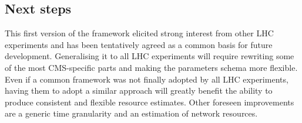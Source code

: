 \subsection{Next steps}
This first version of the framework elicited strong interest from
other LHC experiments and has been tentatively agreed as a common
basis for future development. Generalising it to all LHC experiments
will require rewriting some of the most CMS-specific parts and making
the parameters schema more flexible. Even if a common framework was
not finally adopted by all LHC experiments, having them to adopt a
similar approach will greatly benefit the ability to produce
consistent and flexible resource estimates.  Other foreseen
improvements are a generic time granularity and an estimation of
network resources.
